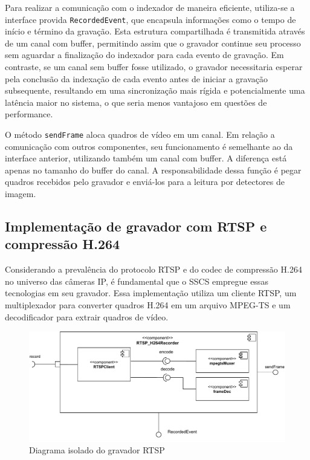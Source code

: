 \documentclass[12pt, %
openright, 
oneside, %
a4paper,    %
brazil]{facom-ufu-abntex2}
\begin{document}
Para realizar a comunicação com o indexador de maneira eficiente, utiliza-se a
interface provida \texttt{RecordedEvent}, que encapsula informações como o
tempo de início e término da gravação. Esta estrutura compartilhada é
transmitida através de um canal com buffer, permitindo assim que o gravador
continue seu processo sem aguardar a finalização do indexador para cada evento
de gravação. Em contraste, se um canal sem buffer fosse utilizado, o gravador
necessitaria esperar pela conclusão da indexação de cada evento antes de
iniciar a gravação subsequente, resultando em uma sincronização mais rígida e
potencialmente uma latência maior no sistema, o que seria menos vantajoso em
questões de performance.

O método \texttt{sendFrame} aloca quadros de vídeo em um canal. Em relação a
comunicação com outros componentes, seu funcionamento é semelhante ao da
interface anterior, utilizando também um canal com buffer. A diferença está
apenas no tamanho do buffer do canal. A responsabilidade dessa função é pegar
quadros recebidos pelo gravador e enviá-los para a leitura por detectores de
imagem.

\subsection{Implementação de gravador com RTSP e compressão H.264}

Considerando a prevalência do protocolo RTSP e do codec de compressão H.264 no
universo das câmeras IP, é fundamental que o SSCS empregue essas tecnologias em
seu gravador. Essa implementação utiliza um cliente RTSP, um multiplexador para
converter quadros H.264 em um arquivo MPEG-TS e um decodificador para extrair
quadros de vídeo.

\begin{figure}[!ht]
	\centering
	\includegraphics[width=1\linewidth]{rtsp_h264recorder.pdf}
	\caption[Diagrama isolado do gravador RTSP]{Diagrama isolado do gravador RTSP}
	\label{fig:graficosVariandoTamanhoRede}
\end{figure}
\end{document}
